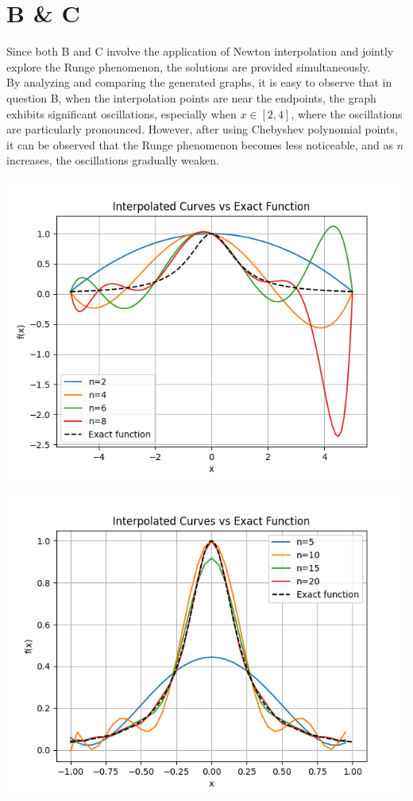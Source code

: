 \documentclass[a4paper]{article}
\begin{document}
\section*{B \& C}

Since both B and C involve the application of Newton interpolation and jointly explore the Runge phenomenon, the solutions are provided simultaneously. \\
By analyzing and comparing the generated graphs, it is easy to observe that in question B, when the interpolation points are near the endpoints, the graph exhibits significant oscillations, especially when \( x \in [2,4] \), where the oscillations are particularly pronounced. 
However, after using Chebyshev polynomial points, it can be observed that the Runge phenomenon becomes less noticeable, and as \( n \) increases, the oscillations gradually weaken.
    \begin{minipage}{0.45\textwidth}
        \centering
        \includegraphics[width=\textwidth]{Report_figure/figure_B.png}
    \end{minipage}
    \hfill
    \begin{minipage}{0.45\textwidth}
        \centering
        \includegraphics[width=\textwidth]{Report_figure/figure_C.png}
    \end{minipage}
\end{document}
